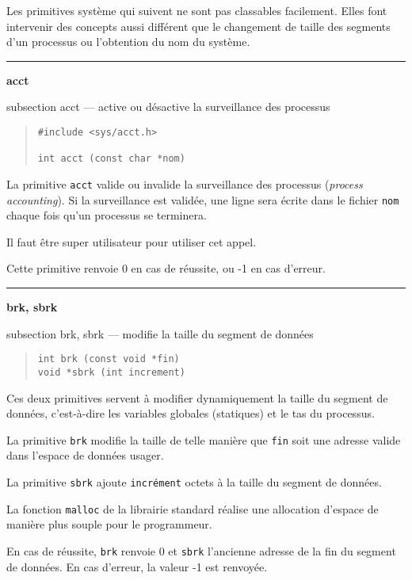 \documentclass [twoside] {report}
\newcommand {\primitive} [1]
    {
	\phantomsection
	{\large \bf #1}
	\addcontentsline {toc} {subsection} {#1}
    }
\newcommand {\separation}
    {
	\vspace {5mm}
	\nopagebreak
	\hrule
    }
\begin{document}
Les primitives système qui suivent ne sont pas
classables facilement. Elles font intervenir des
concepts aussi différent que le changement de
taille des segments d'un processus ou l'obtention
du nom du système.




\separation
\primitive {acct} --- active ou désactive la surveillance des processus

\begin {quote}
\begin {verbatim}
#include <sys/acct.h>

int acct (const char *nom)
\end{verbatim}
\end {quote}

La primitive {\tt acct} valide ou invalide la
surveillance des processus ({\it process
accounting}). Si la surveillance est validée, une
ligne sera écrite dans le fichier {\tt nom} chaque
fois qu'un processus se terminera.

Il faut être super utilisateur pour utiliser cet
appel.

Cette primitive renvoie 0 en cas de réussite, ou
-1 en cas d'erreur.




\separation
\primitive {brk, sbrk} --- modifie la taille du segment de données

\begin {quote}
\begin {verbatim}
int brk (const void *fin)
void *sbrk (int increment)
\end{verbatim}
\end {quote}

Ces deux primitives servent à modifier dynamiquement la taille du
segment de données, c'est-à-dire les variables globales (statiques) et
le tas du processus.

La primitive {\tt brk} modifie la taille de telle manière que {\tt fin}
soit une adresse valide dans l'espace de données usager.

La primitive {\tt sbrk} ajoute {\tt incrément} octets à la taille du
segment de données.

La fonction {\tt malloc} de la librairie standard réalise une allocation
d'espace de manière plus souple pour le programmeur.

En cas de réussite, {\tt brk} renvoie 0 et {\tt sbrk} l'ancienne adresse
de la fin du segment de données.  En cas d'erreur, la valeur -1 est
renvoyée.
\end{document}
